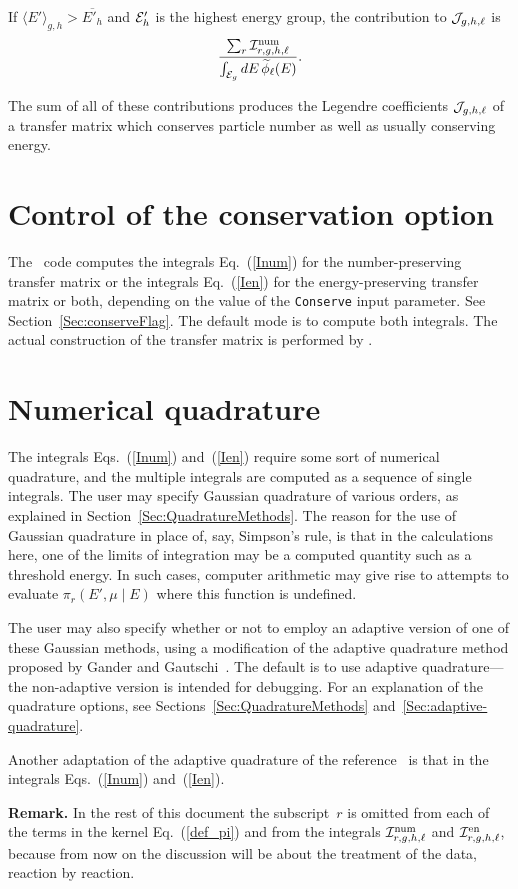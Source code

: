 If $\langle E' \rangle_{g,h} > \overline {E'_h}$ and ${\cal E}'_h$
is the highest energy group, the contribution to ${\cal J}_{g,h,\ell}$
is
$$
  \frac{ \sum_r {\cal I}^{\text{num}}_{r,g,h,\ell} }
       { \int_{{\cal E}_g} dE \, \widetilde \phi_\ell(E) }.
$$

The sum of all of these contributions produces the Legendre
coefficients ${\cal J}_{g,h,\ell}$ of a transfer matrix which conserves
particle number as well as usually conserving energy.

\section{Control of the conservation option}
The \gettransfer\ code computes the integrals Eq.~(\ref{Inum})
for the number-preserving transfer matrix or the
integrals Eq.~(\ref{Ien}) for the energy-preserving transfer matrix
or both, depending on the value of the \texttt{Conserve}
input parameter.  See Section~\ref{Sec:conserveFlag}.
 The default mode is to
compute both integrals.  The actual construction
of the transfer matrix is performed by \xndfgen.

\section{Numerical quadrature}
The integrals Eqs.~(\ref{Inum}) and~(\ref{Ien}) require some sort
of numerical quadrature, and the multiple integrals are computed as
a sequence of single integrals.  The user may specify Gaussian quadrature
of various orders, as explained in Section~\ref{Sec:QuadratureMethods}.
The reason for the use of Gaussian quadrature in place of, say, Simpson's
rule, is that in the calculations here,
one of the limits of integration may be a computed quantity
such as a threshold energy.  In such cases, computer arithmetic may
give rise to attempts to evaluate $\pi_r(E', \mu \mid E)$
where this function is undefined.

The user may also specify whether or not to employ an adaptive 
version of one of these Gaussian methods, using
a modification of the
adaptive quadrature method proposed by Gander and Gautschi~\cite{Gander}.
The default is to use adaptive quadrature---the non-adaptive version
is intended for debugging.  For an explanation of the quadrature options,
see Sections~\ref{Sec:QuadratureMethods} and~\ref{Sec:adaptive-quadrature}.

Another adaptation of the adaptive quadrature of the reference~\cite{Gander}
is that in the integrals Eqs.~(\ref{Inum}) and~(\ref{Ien}).

\textbf{Remark.} In the rest of this document the
subscript~$r$ is omitted from each of the terms in the kernel
Eq.~(\ref{def_pi}) and from the integrals
${\cal I}^{\text{num}}_{r,g,h,\ell}$ and ${\cal I}^{\text{en}}_{r,g,h,\ell}$, because from now on the discussion will be
about the treatment of the data, reaction by reaction.

